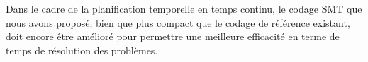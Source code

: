 Dans le cadre de la planification temporelle en temps continu, le codage SMT que nous avons proposé, bien que plus compact que le codage de référence existant, doit encore être amélioré pour permettre une meilleure efficacité en terme de temps de résolution des problèmes.

